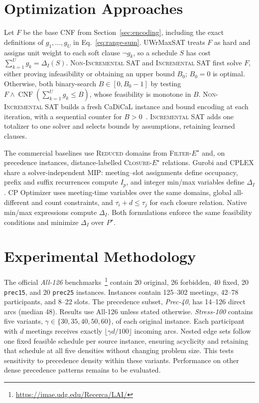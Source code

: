 \documentclass[conference,a4paper]{IEEEtran}
\newcommand{\revised}[1]{#1}
\begin{document}
\section{Optimization Approaches}
\label{sec:optimization}

Let $F$ be the base CNF from Section~\ref{sec:encoding}, including the exact definitions of $g_1,\ldots,g_U$ in Eq.~\eqref{eq:range-sum}. UWrMaxSAT treats $F$ as hard and assigns unit weight to each soft clause $\neg g_k$, so a schedule $S$ has cost $\sum_{k=1}^{U}g_k=\Delta_I(S)$.  \textsc{Non-Incremental SAT} and \textsc{Incremental SAT} first solve $F$, either proving infeasibility or obtaining an upper bound $B_0$; $B_0=0$ is optimal.  Otherwise, both binary-search $B\in[0,B_0-1]$ by testing $F\land\operatorname{CNF}(\sum_{k=1}^{U}g_k\leq B)$, whose feasibility is monotone in $B$.  \textsc{Non-Incremental SAT} builds a fresh CaDiCaL instance and bound encoding at each iteration, with a sequential counter for $B>0$~\cite{sinz2005}.  \textsc{Incremental SAT} adds one totalizer to one solver and selects bounds by assumptions, retaining learned clauses.

The commercial baselines use \mbox{\textsc{Reduced}} domains from \mbox{\textnormal{\textsc{Filter-}}\ensuremath{E^\star}} and, on precedence instances, distance-labelled \mbox{\textnormal{\textsc{Closure-}}\ensuremath{E^\star}} relations.  Gurobi and CPLEX share a solver-independent MIP: meeting--slot assignments define occupancy, prefix and suffix recurrences compute $I_p$, and integer min/max variables define $\Delta_I$.  CP Optimizer uses meeting-time variables over the same domains, global all-different and count constraints, and $\tau_i+d\leq\tau_j$ for each closure relation.  Native min/max expressions compute $\Delta_I$.  Both formulations enforce the same feasibility conditions and minimize $\Delta_I$ over $P^\star$.

\section{Experimental Methodology}
\label{sec:experiments}

\revised{The official \emph{All-126} benchmarks~\cite{bofill2022}\footnote{\url{https://imae.udg.edu/Recerca/LAI/}} contain 20 original, 26 forbidden, 40 fixed, 20 \texttt{prec15}, and 20 \texttt{prec25} instances. Instances contain 125--302 meetings, 42--78 participants, and 8--22 slots. The precedence subset, \emph{Prec-40}, has 14--126 direct arcs (median 48). Results use All-126 unless stated otherwise. \emph{Stress-100} contains five variants, $\gamma\in\{30,35,40,50,60\}$, of each original instance. Each participant with $d$ meetings receives exactly $\lfloor\gamma d/100\rfloor$ incoming arcs. Nested edge sets follow one fixed feasible schedule per source instance, ensuring acyclicity and retaining that schedule at all five densities without changing problem size. This tests sensitivity to precedence density within these variants. Performance on other dense precedence patterns remains to be evaluated.}
\end{document}
